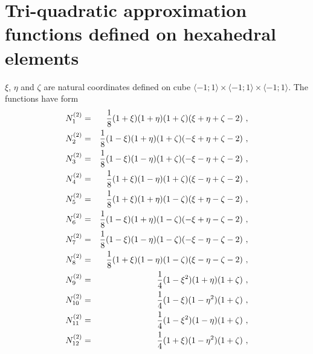 


\section{Tri-quadratic approximation functions defined on hexahedral elements}
$\xi$, $\eta$ and $\zeta$ are natural coordinates defined on cube
$\langle-1;1\rangle\times\langle-1;1\rangle\times\langle-1;1\rangle$. The functions have form
\begin{eqnarray}
\label{bfquadhexn1}
N_{1}^{(2)} &=& \del{1}{8} (1 + \xi) (1 + \eta) (1 + \zeta)
(\xi + \eta + \zeta - 2)\ ,
\\ \label{bfquadhexn2}
N_{2}^{(2)} &=& \del{1}{8} (1 - \xi) (1 + \eta) (1 + \zeta)
(- \xi + \eta + \zeta - 2)\ ,
\\ \label{bfquadhexn3}
N_{3}^{(2)} &=& \del{1}{8} (1 - \xi) (1 - \eta) (1 + \zeta)
(- \xi - \eta + \zeta - 2)\ ,
\\ \label{bfquadhexn4}
N_{4}^{(2)} &=& \del{1}{8} (1 + \xi) (1 - \eta) (1 + \zeta)
(\xi - \eta + \zeta - 2)\ ,
\\ \label{bfquadhexn5}
N_{5}^{(2)} &=& \del{1}{8} (1 + \xi) (1 + \eta) (1 - \zeta)
(\xi + \eta - \zeta - 2)\ ,
\\ \label{bfquadhexn6}
N_{6}^{(2)} &=& \del{1}{8} (1 - \xi) (1 + \eta) (1 - \zeta)
(- \xi + \eta - \zeta - 2)\ ,
\\ \label{bfquadhexn7}
N_{7}^{(2)} &=& \del{1}{8} (1 - \xi) (1 - \eta) (1 - \zeta)
(- \xi - \eta - \zeta - 2)\ ,
\\ \label{bfquadhexn8}
N_{8}^{(2)} &=& \del{1}{8} (1 + \xi) (1 - \eta) (1 - \zeta)
(\xi - \eta - \zeta - 2)\ ,
\\ \label{bfquadhexn9}
N_{9}^{(2)} &=& \del{1}{4} (1 - \xi^2) (1 + \eta) (1 + \zeta)\ ,
\\ \label{bfquadhexn10}
N_{10}^{(2)} &=& \del{1}{4} (1 - \xi) (1 - \eta^2) (1 + \zeta)\ ,
\\ \label{bfquadhexn11}
N_{11}^{(2)} &=& \del{1}{4} (1 - \xi^2) (1 - \eta) (1 + \zeta)\ ,
\\ \label{bfquadhexn12}
N_{12}^{(2)} &=& \del{1}{4} (1 + \xi) (1 - \eta^2) (1 + \zeta)\ ,
\\ \label{bfquadhexn13}

\end{eqnarray}
